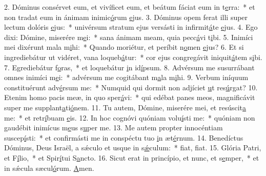 2. Dóminus consérvet eum, et vivíficet eum, et beátum fáciat eum in t\uline{e}rra:~* et non tradat eum in ánimam inimic\uline{ó}rum \uline{e}jus.
3. Dóminus opem ferat illi super lectum dolóris \uline{e}jus:~* univérsum stratum ejus versásti in infirmit\uline{á}te \uline{e}jus.
4. Ego dixi: Dómine, miserére m\uline{e}i:~* sana ánimam meam, quia pecc\uline{á}vi t\uline{i}bi.
5. Inimíci mei dixérunt mala m\uline{i}hi:~* Quando moriétur, et períbit n\uline{o}men \uline{e}jus?
6. Et si ingrediebátur ut vidéret, vana loqueb\uline{á}tur:~* cor ejus congregávit iniquit\uline{á}tem s\uline{i}bi.
7. Egrediebátur f\uline{o}ras,~* et loquebátur \uline{i}n id\uline{í}psum.
8. Advérsum me susurrábant omnes inimíci m\uline{e}i:~* advérsum me cogitábant m\uline{a}la m\uline{i}hi.
9. Verbum iníquum constituérunt adv\uline{é}rsum me:~* Numquid qui dormit non adjíciet \uline{u}t res\uline{ú}rgat?
10. Etenim homo pacis meæ, in quo sper\uline{á}vi:~* qui edébat panes meos, magnificávit super me supplant\uline{a}ti\uline{ó}nem.
11. Tu autem, Dómine, miserére mei, et resúscit\uline{a} me:~* et retr\uline{í}buam \uline{e}is.
12. In hoc cognóvi quóniam volu\uline{í}sti me:~* quóniam non gaudébit inimícus m\uline{e}us s\uline{u}per me.
13. Me autem propter innocéntiam suscep\uline{í}sti:~* et confirmásti me in conspéctu tuo \uline{i}n æt\uline{é}rnum.
14. Benedíctus Dóminus, Deus Israël, a sǽculo et usque in s\uline{ǽ}culum:~* f\uline{i}at, f\uline{i}at.
15. Glória Patri, et F\uline{í}lio,~* et Spir\uline{í}tui S\uline{a}ncto.
16. Sicut erat in princípio, et nunc, et s\uline{e}mper,~* et in sǽcula sæcul\uline{ó}rum. \uline{A}men.
